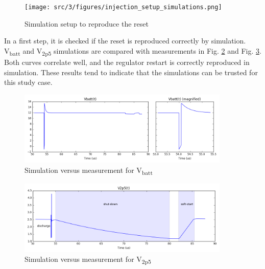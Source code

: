 \begin{figure}[!htbp]
  \centering
  \texttt{[image: src/3/figures/injection\_setup\_simulations.png]}
  \caption{Simulation setup to reproduce the reset}
  \label{fig:sim-setup-reset}
\end{figure}

In a first step, it is checked if the reset is reproduced correctly by simulation.
V\textsubscript{batt} and V\textsubscript{2p5} simulations are compared with measurements in Fig. \ref{fig:wvf-vbatt} and Fig. \ref{fig:wvf-v2p5}.
Both curves correlate well, and the regulator restart is correctly reproduced in simulation.
These results tend to indicate that the simulations can be trusted for this study case.

\begin{figure}[!htbp]
  \centering
  \includegraphics[width=0.9\textwidth]{src/3/figures/vbatt.png}
  \caption{Simulation versus measurement for V\textsubscript{batt}}
  \label{fig:wvf-vbatt}
\end{figure}

\begin{figure}[!htbp]
  \centering
  \includegraphics[width=0.9\textwidth]{src/3/figures/v2p5.png}
  \caption{Simulation versus measurement for V\textsubscript{2p5}}
  \label{fig:wvf-v2p5}
\end{figure}

